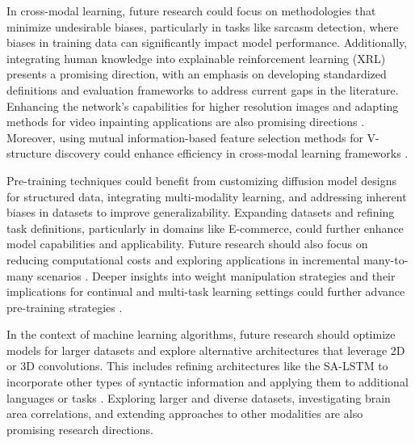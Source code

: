 In cross-modal learning, future research could focus on methodologies that minimize undesirable biases, particularly in tasks like sarcasm detection, where biases in training data can significantly impact model performance. Additionally, integrating human knowledge into explainable reinforcement learning (XRL) presents a promising direction, with an emphasis on developing standardized definitions and evaluation frameworks to address current gaps in the literature. Enhancing the network's capabilities for higher resolution images and adapting methods for video inpainting applications are also promising directions \cite{kim2020texturetransformattentionrealistic}. Moreover, using mutual information-based feature selection methods for V-structure discovery could enhance efficiency in cross-modal learning frameworks \cite{ling2021bayesiannetworkstructurelearning}.



Pre-training techniques could benefit from customizing diffusion model designs for structured data, integrating multi-modality learning, and addressing inherent biases in datasets to improve generalizability. Expanding datasets and refining task definitions, particularly in domains like E-commerce, could further enhance model capabilities and applicability. Future research should also focus on reducing computational costs and exploring applications in incremental many-to-many scenarios \cite{dhariwal2021diffusion}. Deeper insights into weight manipulation strategies and their implications for continual and multi-task learning settings could further advance pre-training strategies \cite{chitale2023taskarithmeticloracontinual}.



In the context of machine learning algorithms, future research should optimize models for larger datasets and explore alternative architectures that leverage 2D or 3D convolutions. This includes refining architectures like the SA-LSTM to incorporate other types of syntactic information and applying them to additional languages or tasks \cite{raposo2019lowdimensionalembodiedsemanticsmusic}. Exploring larger and diverse datasets, investigating brain area correlations, and extending approaches to other modalities are also promising research directions.



